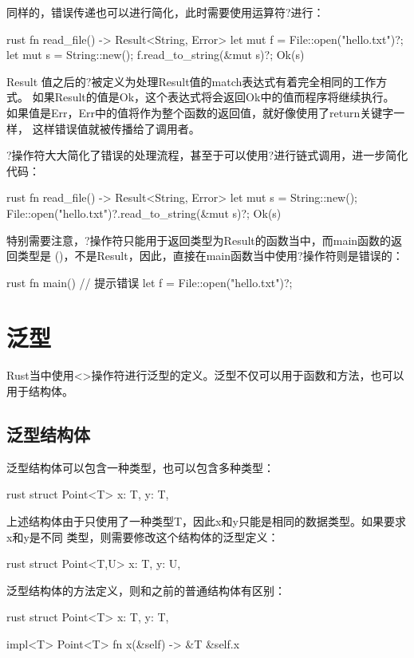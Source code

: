 同样的，错误传递也可以进行简化，此时需要使用运算符?进行：
\begin{code-block}{rust}
fn read_file() -> Result<String, Error> {
    let mut f = File::open("hello.txt")?;
    let mut s = String::new();
    f.read_to_string(&mut s)?;
    Ok(s)
}
\end{code-block}
Result 值之后的?被定义为处理Result值的match表达式有着完全相同的工作方式。
如果Result的值是Ok，这个表达式将会返回Ok中的值而程序将继续执行。
如果值是Err，Err中的值将作为整个函数的返回值，就好像使用了return关键字一样，
这样错误值就被传播给了调用者。

?操作符大大简化了错误的处理流程，甚至于可以使用?进行链式调用，进一步简化代码：
\begin{code-block}{rust}
fn read_file() -> Result<String, Error> {
    let mut s = String::new();
    File::open("hello.txt")?.read_to_string(&mut s)?;
    Ok(s)
}
\end{code-block}

特别需要注意，?操作符只能用于返回类型为Result的函数当中，而main函数的返回类型是
()，不是Result，因此，直接在main函数当中使用?操作符则是错误的：
\begin{code-block}{rust}
fn main() {
    // 提示错误
    let f = File::open("hello.txt")?;
}
\end{code-block}

\section{泛型}
Rust当中使用<>操作符进行泛型的定义。泛型不仅可以用于函数和方法，也可以用于结构体。
\subsection{泛型结构体}
泛型结构体可以包含一种类型，也可以包含多种类型：
\begin{code-block}{rust}
struct Point<T> {
    x: T,
    y: T,
}
\end{code-block}
上述结构体由于只使用了一种类型T，因此x和y只能是相同的数据类型。如果要求x和y是不同
类型，则需要修改这个结构体的泛型定义：
\begin{code-block}{rust}
struct Point<T,U> {
    x: T,
    y: U,
}
\end{code-block}

泛型结构体的方法定义，则和之前的普通结构体有区别：
\begin{code-block}{rust}
struct Point<T> {
    x: T,
    y: T,
}

impl<T> Point<T> {
    fn x(&self) -> &T {
        &self.x
    }
}
\end{code-block}


